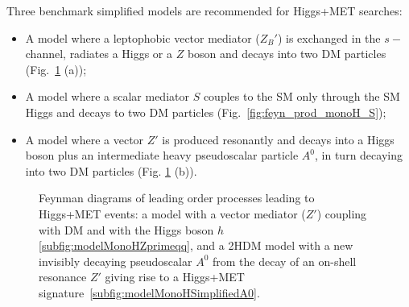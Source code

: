 Three benchmark simplified models \cite{Carpenter:2013xra,Berlin:2014cfa} 
are recommended for Higgs+MET searches:
\begin{itemize}
	\item A model where a leptophobic vector mediator ($Z_B'$) is exchanged in the $s-$channel, 
	radiates a Higgs or a $Z$ boson and decays into two DM particles (Fig.~\ref{fig:feyn_prod_monoH} (a));
	\item A model where a scalar mediator $S$ couples to the SM only 
	through the SM Higgs and decays to two DM particles (Fig.~\ref{fig:feyn_prod_monoH_S});
	\item A model where a vector $Z'$ is produced resonantly and decays into a Higgs boson
	plus an intermediate heavy pseudoscalar particle $A^0$, in turn decaying into two DM particles (Fig. \ref{fig:feyn_prod_monoH} (b)). 
\end{itemize}

\begin{figure}[!h!tpd]
	\centering
	\textwidth
	\caption
	{
		Feynman diagrams of leading order processes leading to Higgs+MET events: a model with a vector mediator ($Z'$) 
		coupling with DM and with the Higgs boson $h$ \ref{subfig:modelMonoHZprimeqq}, and
		a 2HDM model with a new invisibly decaying pseudoscalar $A^0$ 
		from the decay of an on-shell resonance $Z'$ giving rise to a Higgs+MET signature~\ref{subfig:modelMonoHSimplifiedA0}.
	}
	\label{fig:feyn_prod_monoH}
\end{figure}
		

